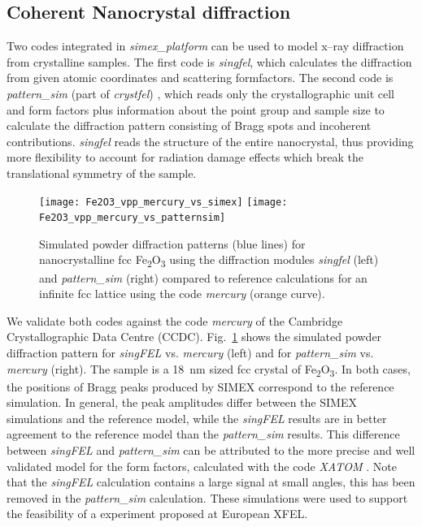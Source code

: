 \documentclass[10pt]{scrartcl}
\begin{document}
\subsection{Coherent Nanocrystal diffraction\label{sec:coherent_nanocrystal_diffraction}}
Two codes integrated in \textit{simex\_platform} can be used to model x--ray
diffraction from crystalline samples. The first code is \textit{singfel},
which calculates the diffraction from given atomic coordinates and scattering
formfactors. The second code is \textit{pattern\_sim} (part of
\textit{crystfel}) \cite{White2012}, which
reads only the crystallographic unit cell and form factors plus information
about the point group and sample size to calculate the diffraction
pattern consisting of Bragg spots and incoherent contributions.
\textit{singfel} reads the structure of the entire nanocrystal, thus providing
more flexibility to account for radiation damage effects which break the
translational symmetry of the sample.
%
\begin{figure}[ht]
  \begin{center}
      \texttt{[image: Fe2O3\_vpp\_mercury\_vs\_simex]}
      \texttt{[image: Fe2O3\_vpp\_mercury\_vs\_patternsim]}
  \caption{Simulated powder diffraction patterns (blue lines) for nanocrystalline fcc Fe\textsubscript{2}O\textsubscript{3}
  using the diffraction modules \textit{singfel} (left) and \textit{pattern\_sim}
  (right) compared to reference calculations for an infinite fcc lattice
    using the code \textit{mercury} (orange curve).}
    \label{fig:Fe2O3_vpp_model_vs_model}
  \end{center}
\end{figure}
%
We validate both codes against the code \textit{mercury} \cite{Macrae2008} of the
Cambridge Crystallographic Data Centre (CCDC). Fig.~\ref{fig:Fe2O3_vpp_model_vs_model} shows the simulated
powder diffraction pattern for \textit{singFEL} vs. \textit{mercury} (left)
and for \textit{pattern\_sim} vs. \textit{mercury} (right). The sample is a
\SI{18}{\nano\metre} sized fcc crystal of
Fe\textsubscript{2}O\textsubscript{3}. In both cases, the
positions of Bragg peaks produced by SIMEX correspond to the reference
simulation. In general, the peak amplitudes differ between the SIMEX simulations and the
reference model, while the \textit{singFEL} results are in better agreement to the
reference model than the \textit{pattern\_sim} results. This difference between
\textit{singFEL} and \textit{pattern\_sim} can be attributed to the more
precise and well validated model for the form factors, calculated with the code \textit{XATOM}
\cite{Son2011}. Note that the \textit{singFEL} calculation contains a
large signal at small angles, this has been removed in the \textit{pattern\_sim}
calculation. These simulations were used to support the feasibility of a
experiment proposed at European XFEL.
\end{document}
